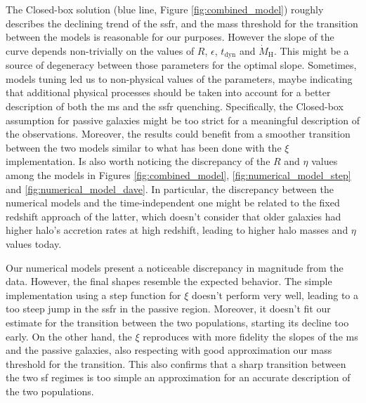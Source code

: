 \documentclass[fleqn, usenatbib]{mnras}
\begin{document}
The Closed-box solution (blue line, Figure \ref{fig:combined_model}) roughly describes the declining trend of the \acrshort{ssfr}, and the mass threshold for the transition between the models is reasonable for our purposes. However the slope of the curve depends non-trivially on the values of \(R\), \(\epsilon\), \(t_{\mathrm{dyn}}\) and \(\dot{M}_{\mathrm{H}}\). This might be a source of degeneracy between those parameters for the optimal slope. Sometimes, models tuning led us to non-physical values of the parameters, maybe indicating that additional physical processes should be taken into account for a better description of both the \acrshort{ms} and the \acrshort{ssfr} quenching. Specifically, the Closed-box assumption for passive galaxies might be too strict for a meaningful description of the observations. Moreover, the results could benefit from a smoother transition between the two models similar to what has been done with the \citeauthor{Dave2011} \(\xi\) implementation. Is also worth noticing the discrepancy of the \(R\) and \(\eta\) values among the models in Figures \ref{fig:combined_model}, \ref{fig:numerical_model_step} and \ref{fig:numerical_model_dave}. In particular, the discrepancy between the numerical models and the time-independent one might be related to the fixed redshift approach of the latter, which doesn't consider that older galaxies had higher halo's accretion rates at high redshift, leading to higher halo masses and \(\eta\) values today.

Our numerical models present a noticeable discrepancy in magnitude from the data. However, the final shapes resemble the expected behavior. The simple implementation using a step function for \(\xi\) doesn't perform very well, leading to a too steep jump in the \acrshort{ssfr} in the passive region. Moreover, it doesn't fit our estimate for the transition between the two populations, starting its decline too early. On the other hand, the \citeauthor{Dave2011} \(\xi\) reproduces with more fidelity the slopes of the \acrshort{ms} and the passive galaxies, also respecting with good approximation our mass threshold for the transition. This also confirms that a sharp transition between the two \acrshort{sf} regimes is too simple an approximation for an accurate description of the two populations.
\end{document}
